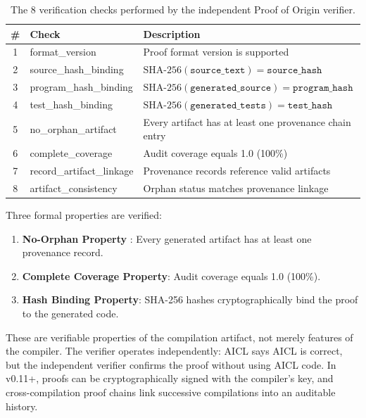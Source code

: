 \documentclass[11pt]{article}
\newcommand{\aicl}{\textsc{AICL}}
\newcommand{\proofoforigin}{Proof of Origin}
\begin{document}
\begin{table}[htbp]
\centering
\caption{The 8 verification checks performed by the independent \proofoforigin{} verifier.}
\label{tab:verification}
\begin{tabular}{@{}clp{7.5cm}@{}}
\toprule
\textbf{\#} & \textbf{Check} & \textbf{Description} \\
\midrule
1 & format\_version & Proof format version is supported \\
2 & source\_hash\_binding & $\text{SHA-256}(\texttt{source\_text}) = \texttt{source\_hash}$ \\
3 & program\_hash\_binding & $\text{SHA-256}(\texttt{generated\_source}) = \texttt{program\_hash}$ \\
4 & test\_hash\_binding & $\text{SHA-256}(\texttt{generated\_tests}) = \texttt{test\_hash}$ \\
5 & no\_orphan\_artifact & Every artifact has at least one provenance chain entry \\
6 & complete\_coverage & Audit coverage equals 1.0 (100\%) \\
7 & record\_artifact\_linkage & Provenance records reference valid artifacts \\
8 & artifact\_consistency & Orphan status matches provenance linkage \\
\bottomrule
\end{tabular}
\end{table}

Three formal properties are verified:
\begin{enumerate}[leftmargin=*,itemsep=2pt]
  \item \textbf{No-Orphan Property} \citep{philippeantoine2026noorphan}: Every generated artifact has at least one provenance record.
  \item \textbf{Complete Coverage Property}: Audit coverage equals 1.0 (100\%).
  \item \textbf{Hash Binding Property}: SHA-256 hashes cryptographically bind the proof to the generated code.
\end{enumerate}

These are verifiable properties of the compilation artifact, not merely features of the compiler. The verifier operates independently: \aicl{} says \aicl{} is correct, but the independent verifier confirms the proof without using \aicl{} code. In v0.11+, proofs can be cryptographically signed with the compiler's key, and cross-compilation proof chains link successive compilations into an auditable history.
\end{document}
